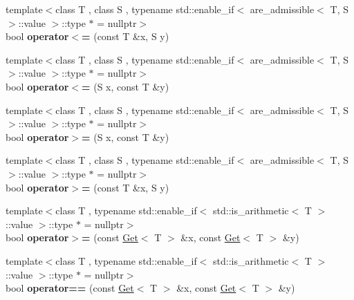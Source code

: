 \begin{DoxyCompactItemize}
\item 
{\footnotesize template$<$class T , class S , typename std\+::enable\+\_\+if$<$ are\+\_\+admissible$<$ T, S $>$\+::value $>$\+::type $\ast$  = nullptr$>$ }\\bool {\bfseries operator$<$=} (const T \&x, S y)\hypertarget{namespaceSpacy_1_1Mixin_a131d3aa9b0e7936adbbf96cce4d3ebc9}{}\label{namespaceSpacy_1_1Mixin_a131d3aa9b0e7936adbbf96cce4d3ebc9}

\item 
{\footnotesize template$<$class T , class S , typename std\+::enable\+\_\+if$<$ are\+\_\+admissible$<$ T, S $>$\+::value $>$\+::type $\ast$  = nullptr$>$ }\\bool {\bfseries operator$<$=} (S x, const T \&y)\hypertarget{namespaceSpacy_1_1Mixin_a1591c164ff658a1b3595a682291057e2}{}\label{namespaceSpacy_1_1Mixin_a1591c164ff658a1b3595a682291057e2}

\item 
{\footnotesize template$<$class T , class S , typename std\+::enable\+\_\+if$<$ are\+\_\+admissible$<$ T, S $>$\+::value $>$\+::type $\ast$  = nullptr$>$ }\\bool {\bfseries operator$>$=} (S x, const T \&y)\hypertarget{namespaceSpacy_1_1Mixin_a9627fef30e8c5143bbc5cb1272e58dfd}{}\label{namespaceSpacy_1_1Mixin_a9627fef30e8c5143bbc5cb1272e58dfd}

\item 
{\footnotesize template$<$class T , class S , typename std\+::enable\+\_\+if$<$ are\+\_\+admissible$<$ T, S $>$\+::value $>$\+::type $\ast$  = nullptr$>$ }\\bool {\bfseries operator$>$=} (const T \&x, S y)\hypertarget{namespaceSpacy_1_1Mixin_ae70bf3841fe3482d0453353ca9c5e520}{}\label{namespaceSpacy_1_1Mixin_ae70bf3841fe3482d0453353ca9c5e520}

\item 
{\footnotesize template$<$class T , typename std\+::enable\+\_\+if$<$ std\+::is\+\_\+arithmetic$<$ T $>$\+::value $>$\+::type $\ast$  = nullptr$>$ }\\bool {\bfseries operator$>$=} (const \hyperlink{classSpacy_1_1Mixin_1_1Get}{Get}$<$ T $>$ \&x, const \hyperlink{classSpacy_1_1Mixin_1_1Get}{Get}$<$ T $>$ \&y)\hypertarget{namespaceSpacy_1_1Mixin_a9e07ddd0d023075f79f25fa116eed519}{}\label{namespaceSpacy_1_1Mixin_a9e07ddd0d023075f79f25fa116eed519}

\item 
{\footnotesize template$<$class T , typename std\+::enable\+\_\+if$<$ std\+::is\+\_\+arithmetic$<$ T $>$\+::value $>$\+::type $\ast$  = nullptr$>$ }\\bool {\bfseries operator==} (const \hyperlink{classSpacy_1_1Mixin_1_1Get}{Get}$<$ T $>$ \&x, const \hyperlink{classSpacy_1_1Mixin_1_1Get}{Get}$<$ T $>$ \&y)\hypertarget{namespaceSpacy_1_1Mixin_a7d0e348c6ad04400c0ba6479cd36394f}{}\label{namespaceSpacy_1_1Mixin_a7d0e348c6ad04400c0ba6479cd36394f}


\end{DoxyCompactItemize}
